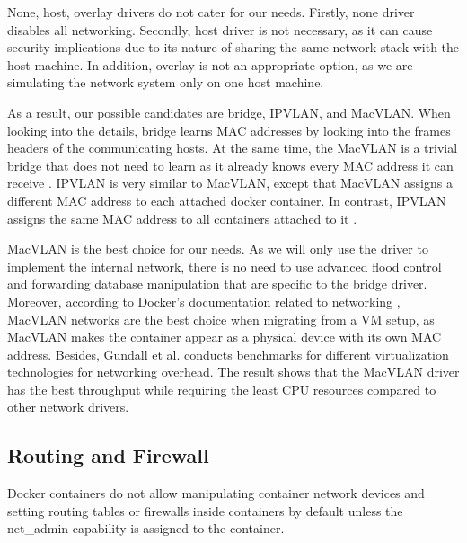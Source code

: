 \documentclass[article]{aaltoseries}
\begin{document}
None, host, overlay drivers do not cater for our needs. Firstly, none driver disables all networking. Secondly, host driver is not necessary, as it can cause security implications due to its nature of sharing the same network stack with the host machine. In addition, overlay is not an appropriate option, as we are simulating the network system only on one host machine.

As a result, our possible candidates are bridge, IPVLAN, and MacVLAN. When looking into the details, bridge learns MAC addresses by looking into the frames headers of the communicating hosts. At the same time, the MacVLAN is a trivial bridge that does not need to learn as it already knows every MAC address it can receive \cite{9620212}. IPVLAN is very similar to MacVLAN, except that MacVLAN assigns a different MAC address to each attached docker container. In contrast, IPVLAN assigns the same MAC address to all containers attached to it \cite{7502883}.

MacVLAN is the best choice for our needs. As we will only use the driver to implement the internal network, there is no need to use advanced flood control and forwarding database manipulation that are specific to the bridge driver. Moreover, according to Docker's documentation related to networking \cite{docker_documentation_2023}, MacVLAN networks are the best choice when migrating from a VM setup, as MacVLAN makes the container appear as a physical device with its own MAC address. Besides, Gundall et al. \cite{9442123} conducts benchmarks for different virtualization technologies for networking overhead. The result shows that the MacVLAN driver has the best throughput while requiring the least CPU resources compared to other network drivers.

\subsection{Routing and Firewall}

Docker containers do not allow manipulating container network devices and setting routing tables or firewalls inside containers by default unless the net\_admin capability is assigned to the container.
\end{document}
